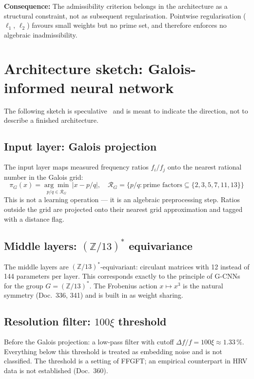 \textbf{Consequence:} The admissibility criterion belongs in the
architecture as a structural constraint, not as subsequent
regularisation. Pointwise regularisation ($\ell_1$, $\ell_2$) favours
small weights but no prime set, and therefore enforces no algebraic
inadmissibility.

\section{Architecture sketch: Galois-informed neural network}
\label{sec:arch}

The following sketch is speculative \SM\ and is meant to indicate the
direction, not to describe a finished architecture.

\subsection*{Input layer: Galois projection}

The input layer maps measured frequency ratios $f_i/f_j$
onto the nearest rational number in the Galois grid:
\[
  \pi_G(x) = \underset{p/q \in \mathcal{R}_G}{\arg\min}\,|x - p/q|,
  \quad \mathcal{R}_G = \{p/q : \text{prime factors} \subseteq \{2,3,5,7,11,13\}\}
\]
This is not a learning operation --- it is an algebraic preprocessing step.
Ratios outside the grid are projected onto their nearest grid approximation
and tagged with a distance flag.

\subsection*{Middle layers: $(\mathbb{Z}/13)^*$ equivariance}

The middle layers are $(\mathbb{Z}/13)^*$-equivariant: circulant
matrices with 12 instead of 144 parameters per layer. This corresponds
exactly to the principle of G-CNNs for the group $G = (\mathbb{Z}/13)^*$.
The Frobenius action $x\mapsto x^3$ is the natural symmetry
(Doc.~336, 341) and is built in as weight sharing.

\subsection*{Resolution filter: $100\xi$ threshold}

Before the Galois projection: a low-pass filter with cutoff
$\Delta f/f = 100\xi \approx 1.33\,\%$. Everything below this threshold
is treated as embedding noise and is not classified.
The threshold is a setting of FFGFT; an empirical counterpart in HRV data
is not established (Doc.~360).


